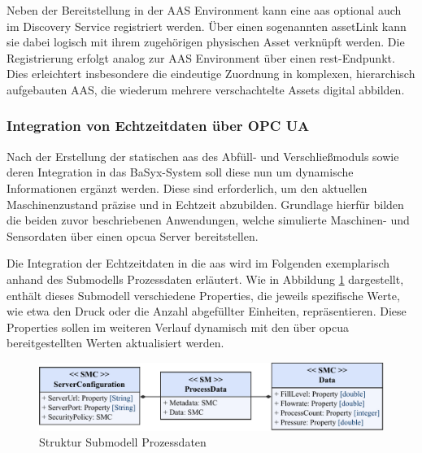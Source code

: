 \vspace{0.25em}


Neben der Bereitstellung in der AAS Environment kann eine \acs{aas} optional auch im Discovery Service registriert werden.
Über einen sogenannten assetLink kann sie dabei logisch mit ihrem zugehörigen physischen Asset verknüpft werden.
Die Registrierung erfolgt analog zur AAS Environment über einen \acs{rest}-Endpunkt.
Dies erleichtert insbesondere die eindeutige Zuordnung in komplexen, hierarchisch aufgebauten AAS, die wiederum mehrere verschachtelte Assets digital abbilden.

\subsubsection{Integration von Echtzeitdaten über OPC UA}

Nach der Erstellung der statischen \acs{aas} des Abfüll- und Verschließmoduls sowie deren Integration in das BaSyx-System soll diese nun um dynamische Informationen ergänzt werden.
Diese sind erforderlich, um den aktuellen Maschinenzustand präzise und in Echtzeit abzubilden.
Grundlage hierfür bilden die beiden zuvor beschriebenen Anwendungen, welche simulierte Maschinen- und Sensordaten über einen \acs{opcua} Server bereitstellen.

Die Integration der Echtzeitdaten in die \acs{aas} wird im Folgenden exemplarisch anhand des Submodells Prozessdaten erläutert.
Wie in Abbildung \ref{fig:SubmodellProzessdaten} dargestellt, enthält dieses Submodell verschiedene Properties, die jeweils spezifische Werte, wie etwa den Druck oder die Anzahl abgefüllter Einheiten, repräsentieren.
Diese Properties sollen im weiteren Verlauf dynamisch mit den über \acs{opcua} bereitgestellten Werten aktualisiert werden.

\begin{figure}[htbp]
    \centering
    \includegraphics[width=1\textwidth]{Bilder/OPCUA/ProcessData.pdf}
    \caption[Struktur Submodell Prozessdaten]{Struktur Submodell Prozessdaten}
    \label{fig:SubmodellProzessdaten}
\end{figure}
\vspace{-0.5em}

